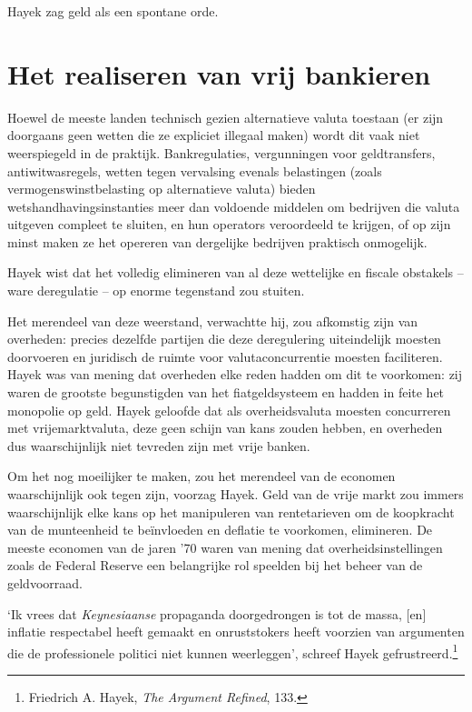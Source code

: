 \documentclass[
  a5paper,
  smalldemyvopaper,11pt,twoside,onecolumn,openright,extrafontsizes,
hidelinks]{memoir}
\begin{document}
Hayek zag geld als een spontane orde.

\section{Het realiseren van vrij
bankieren}\label{het-realiseren-van-vrij-bankieren}

Hoewel de meeste landen technisch gezien alternatieve valuta toestaan
(er zijn doorgaans geen wetten die ze expliciet illegaal maken) wordt
dit vaak niet weerspiegeld in de praktijk. Bankregulaties, vergunningen
voor geldtransfers, antiwitwasregels, wetten tegen vervalsing evenals
belastingen (zoals vermogenswinstbelasting op alternatieve valuta)
bieden wetshandhavingsinstanties meer dan voldoende middelen om
bedrijven die valuta uitgeven compleet te sluiten, en hun operators
veroordeeld te krijgen, of op zijn minst maken ze het opereren van
dergelijke bedrijven praktisch onmogelijk.

Hayek wist dat het volledig elimineren van al deze wettelijke en fiscale
obstakels -- ware deregulatie -- op enorme tegenstand zou stuiten.

Het merendeel van deze weerstand, verwachtte hij, zou afkomstig zijn van
overheden: precies dezelfde partijen die deze deregulering uiteindelijk
moesten doorvoeren en juridisch de ruimte voor valutaconcurrentie
moesten faciliteren. Hayek was van mening dat overheden elke reden
hadden om dit te voorkomen: zij waren de grootste begunstigden van het
fiatgeldsysteem en hadden in feite het monopolie op geld. Hayek geloofde
dat als overheidsvaluta moesten concurreren met vrijemarktvaluta, deze
geen schijn van kans zouden hebben, en overheden dus waarschijnlijk niet
tevreden zijn met vrije banken.

Om het nog moeilijker te maken, zou het merendeel van de economen
waarschijnlijk ook tegen zijn, voorzag Hayek. Geld van de vrije markt
zou immers waarschijnlijk elke kans op het manipuleren van rentetarieven
om de koopkracht van de munteenheid te beïnvloeden en deflatie te
voorkomen, elimineren. De meeste economen van de jaren '70 waren van
mening dat overheidsinstellingen zoals de Federal Reserve een
belangrijke rol speelden bij het beheer van de geldvoorraad.

`Ik vrees dat \emph{Keynesiaanse} propaganda doorgedrongen is tot de
massa, {[}en{]} inflatie respectabel heeft gemaakt en onruststokers
heeft voorzien van argumenten die de professionele politici niet kunnen
weerleggen', schreef Hayek gefrustreerd.\footnote{Friedrich A. Hayek,
  \emph{The Argument Refined}, 133.}
\end{document}
